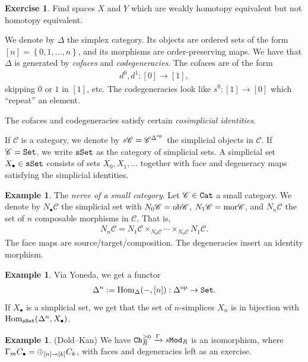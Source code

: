\documentclass[12pt]{amsart}
\theoremstyle{definition}
\newtheorem{example}[theorem]{Example}
\newtheorem{exercise}[theorem]{Exercise}
\begin{document}
\begin{exercise} Find spaces $X$ and $Y$ which are weakly homotopy equivalent but not homotopy equivalent.
\end{exercise}

We denote by $\Delta$ the simplex category. Its objects are ordered sets of the form $[n] = \left\{ 0,1, \ldots, n \right\}$, and its morphisms are order-preserving maps. We have that $\Delta$ is generated by \textit{cofaces} and \textit{codegeneracies}. The cofaces are of the form
\begin{align*}
    d^0,d^1: [0] \to [1],
\end{align*}
skipping $0$ or $1$ in $[1]$, etc. The codegeneracies look like $s^0 : [1] \to [0]$ which ``repeat'' an element.

The cofaces and codegeneracies satisfy certain \textit{cosimplicial identities}.

If $\mathscr{C}$ is a category, we denote by $s \mathscr{C} = \mathscr{C}^{\Delta^{\text{op}}}$ the simplicial objects in $\mathscr{C}$. If $\mathscr{C} = \texttt{Set}$, we write $\texttt{sSet}$ as the category of simplicial sets. A simplicial set $X_\bullet \in \texttt{sSet}$ consists of sets $X_0, X_1, \ldots$ together with face and degeneracy maps satisfying the simplicial identities.

\begin{example} The \textit{nerve of a small category}. Let $\mathscr{C} \in \texttt{Cat}$ a small category. We denote by $N_\bullet \mathscr{C}$ the simplicial set with $N_0 \mathscr{C} = \text{ob} \mathscr{C}$, $N_1 \mathscr{C} = \text{mor} \mathscr{C}$, and $N_n \mathscr{C}$ the set of $n$ composable morphisms in $\mathscr{C}$. That is,
\begin{align*}
    N_n \mathscr{C} = N_1 \mathscr{C} \times_{N_0 \mathscr{C}} \cdots \times_{N_0 \mathscr{C}} N_1 \mathscr{C}.
\end{align*}
The face maps are source/target/composition. The degeneracies insert an identity morphism.
\end{example}

\begin{example} Via Yoneda, we get a functor
\begin{align*}
    \Delta^n := \text{Hom}_\Delta(-,[n]) : \Delta^{\text{op}} \to \texttt{Set}.
\end{align*}
If $X_\bullet$ is a simplicial set, we get that the set of $n$-simplices $X_n$ is in bijection with $\text{Hom}_{\texttt{sSet}}(\Delta^n, X_\bullet)$.
\end{example}

\begin{example} (Dold--Kan) We have $\texttt{Ch}_R^{\ge 0} \xrightarrow{\Gamma} s\texttt{Mod}_R$ is an isomorphism, where $\Gamma_m C_\bullet  =\oplus_{[n] \twoheadrightarrow [k]} C_k$, with faces and degeneracies left as an exercise.
\end{example}
\end{document}
